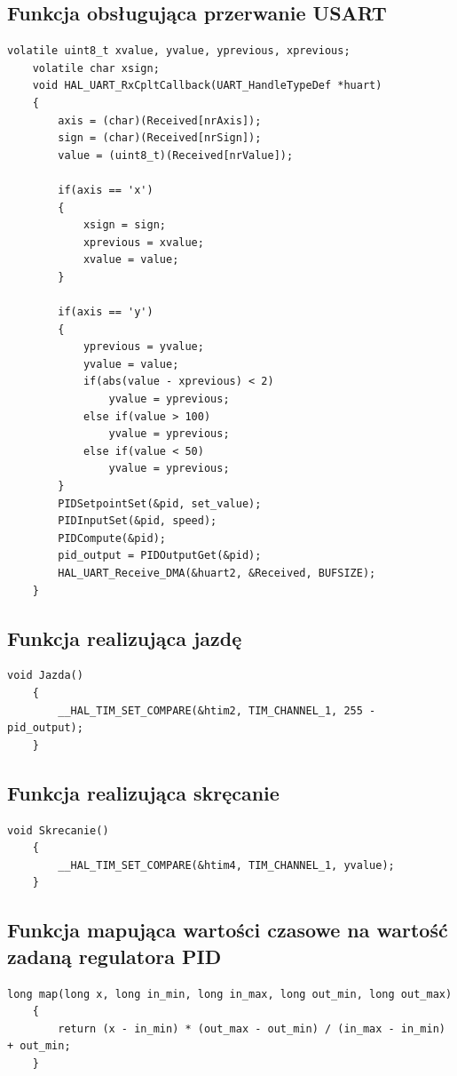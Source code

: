 \documentclass[10pt, a4paper]{article}
\begin{document}
\subsection{Funkcja obsługująca przerwanie USART}

	\begin{lstlisting}[tabsize=2]
	volatile uint8_t xvalue, yvalue, yprevious, xprevious;
	volatile char xsign;
	void HAL_UART_RxCpltCallback(UART_HandleTypeDef *huart) 
	{
		axis = (char)(Received[nrAxis]);
		sign = (char)(Received[nrSign]);
		value = (uint8_t)(Received[nrValue]);
		
		if(axis == 'x')
		{
			xsign = sign;
			xprevious = xvalue;
			xvalue = value;
		}
		
		if(axis == 'y')
		{
			yprevious = yvalue;
			yvalue = value;
			if(abs(value - xprevious) < 2)
				yvalue = yprevious;
			else if(value > 100)
				yvalue = yprevious;
			else if(value < 50)
				yvalue = yprevious;
		}
		PIDSetpointSet(&pid, set_value);
		PIDInputSet(&pid, speed);
		PIDCompute(&pid);
		pid_output = PIDOutputGet(&pid);
		HAL_UART_Receive_DMA(&huart2, &Received, BUFSIZE);
	}
	\end{lstlisting}
	
	\subsection{Funkcja realizująca jazdę}
	
	\begin{lstlisting}[tabsize=2]
	void Jazda()
	{
		__HAL_TIM_SET_COMPARE(&htim2, TIM_CHANNEL_1, 255 - pid_output);
	}
	\end{lstlisting}
	
	\subsection{Funkcja realizująca skręcanie}
	
	\begin{lstlisting}[tabsize=2]
	void Skrecanie()
	{
		__HAL_TIM_SET_COMPARE(&htim4, TIM_CHANNEL_1, yvalue);
	}
	\end{lstlisting}
	
	\subsection{Funkcja mapująca wartości czasowe na wartość zadaną regulatora PID}
	\begin{lstlisting}[tabsize=2]
	long map(long x, long in_min, long in_max, long out_min, long out_max)
	{
		return (x - in_min) * (out_max - out_min) / (in_max - in_min) + out_min;
	}
	\end{lstlisting}
	
\end{document}
